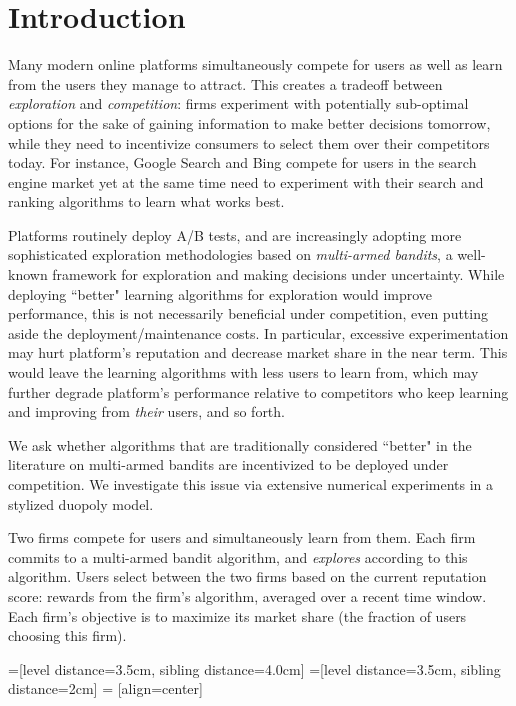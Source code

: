 \documentclass[../competing_bandits_with_appendix.tex]{subfiles}
\begin{document}
\section{Introduction}\label{section:1}

Many modern online platforms simultaneously compete for users as well as learn from the users they manage to attract. This creates a tradeoff between \textit{exploration} and \textit{competition}: firms experiment with potentially sub-optimal options for the sake of gaining information to make better decisions tomorrow, while they need to incentivize consumers to select them over their competitors today. For instance, Google Search and Bing compete for users in the search engine market yet at the same time need to experiment with their search and ranking algorithms to learn what works best.

Platforms routinely deploy A/B tests, and are increasingly adopting  more sophisticated exploration methodologies based on \emph{multi-armed bandits}, a well-known framework for exploration and making decisions under uncertainty. While deploying ``better" learning algorithms for exploration would improve performance, this is not necessarily beneficial under competition, even putting aside the deployment/maintenance costs. In particular, excessive experimentation may hurt platform's reputation and decrease market share in the near term. This would leave the learning algorithms with less users to learn from, which may further degrade platform's performance relative to competitors who keep learning and improving from \emph{their} users, and so forth.

We ask whether algorithms that are traditionally considered ``better" in the literature on multi-armed bandits are incentivized to be deployed under competition. We investigate this issue via extensive numerical experiments in a stylized duopoly model. 

 Two firms compete for users and simultaneously learn from them. Each firm commits to a multi-armed bandit algorithm, and \emph{explores} according to this algorithm. Users select between the two firms based on the current reputation score: rewards from the firm's algorithm, averaged over a recent time window. Each firm's objective is to maximize its  market share (the fraction of users choosing this firm).

=[level distance=3.5cm, sibling distance=4.0cm]
=[level distance=3.5cm, sibling distance=2cm]
 = [align=center]
\end{document}
